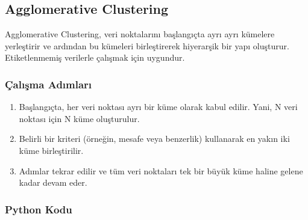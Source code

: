 \newpage

\subsection{Agglomerative Clustering}
Agglomerative Clustering, veri noktalarını başlangıçta ayrı ayrı kümelere yerleştirir ve ardından bu kümeleri birleştirerek hiyerarşik bir yapı oluşturur. Etiketlenmemiş verilerle çalışmak için uygundur.

\subsubsection{Çalışma Adımları}
\begin{enumerate}
    \item Başlangıçta, her veri noktası ayrı bir küme olarak kabul edilir. Yani, N veri noktası için N küme oluşturulur.
    \item Belirli bir kriteri (örneğin, mesafe veya benzerlik) kullanarak en yakın iki küme birleştirilir.
    \item Adımlar tekrar edilir ve tüm veri noktaları tek bir büyük küme haline gelene kadar devam eder.
\end{enumerate}

\subsubsection{Python Kodu}

